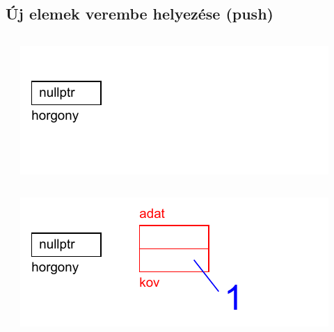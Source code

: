 \subsection{Új elemek verembe helyezése (push)}
\begin{frame}
  \begin{columns}[c]
      \begin{exampleblock}{}
        
      \end{exampleblock}
      \includegraphics[width=\textwidth]{verem/verem01.pdf}
  \end{columns}
\end{frame}

\begin{frame}
  \begin{columns}[c]
      \begin{exampleblock}{}
        
      \end{exampleblock}
      \includegraphics[width=\textwidth]{verem/verem02.pdf}
  \end{columns}
\end{frame}

